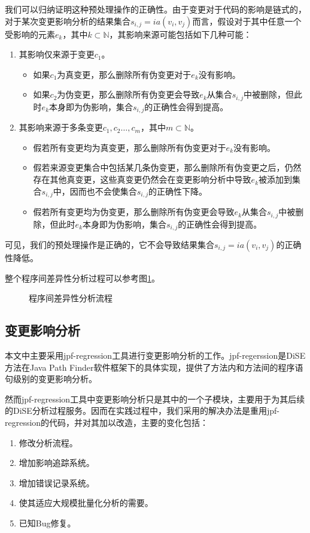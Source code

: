 我们可以归纳证明这种预处理操作的正确性。由于变更对于代码的影响是链式的，对于某次变更影响分析的结果集合$s_{i,j} = ia(v_i,v_j)$而言，假设对于其中任意一个受影响的元素$e_k$，其中$k \subset \mathbb{N}$，其影响来源可能包括如下几种可能：
\begin{enumerate}
	\item 其影响仅来源于变更$c_1$。
		\begin{itemize}
			\item 如果$c_1$为真变更，那么删除所有伪变更对于$e_k$没有影响。
			\item 如果$c_2$为伪变更，那么删除所有伪变更会导致$e_k$从集合$s_{i,j}$中被删除，但此时$e_k$本身即为伪影响，集合$s_{i,j}$的正确性会得到提高。
		\end{itemize}
	\item 其影响来源于多条变更$c_1,c_2\dots,c_m$，其中$m \subset \mathbb{N}$。
		\begin{itemize}
			\item 假若所有变更均为真变更，那么删除所有伪变更对于$e_k$没有影响。
			\item 假若来源变更集合中包括某几条伪变更，那么删除所有伪变更之后，仍然存在其他真变更，这些真变更仍然会在变更影响分析中导致$e_k$被添加到集合$s_{i,j}$中，因而也不会使集合$s_{i,j}$的正确性下降。
			\item 假若所有变更均为伪变更，那么删除所有伪变更会导致$e_k$从集合$s_{i,j}$中被删除，但此时$e_k$本身即为伪影响，集合$s_{i,j}$的正确性会得到提高。
		\end{itemize}
\end{enumerate}

可见，我们的预处理操作是正确的，它不会导致结果集合$s_{i,j} = ia(v_i,v_j)$的正确性降低。

整个程序间差异性分析过程可以参考图\ref {diff}。

\begin{figure}[H]
	\centering
	\caption {程序间差异性分析流程}
	\label {diff}	
\end{figure}

\subsection{变更影响分析}

本文中主要采用jpf-regression工具进行变更影响分析的工作。jpf-regerssion是DiSE方法在Java Path Finder软件框架下的具体实现，提供了方法内和方法间的程序语句级别的变更影响分析。

然而jpf-regression工具中变更影响分析只是其中的一个子模块，主要用于为其后续的DiSE分析过程服务。因而在实践过程中，我们采用的解决办法是重用jpf-regression的代码，并对其加以改造，主要的变化包括：
\begin{enumerate}
	\item 修改分析流程。
	\item 增加影响追踪系统。
	\item 增加错误记录系统。
	\item 使其适应大规模批量化分析的需要。
	\item 已知Bug修复。
\end{enumerate}

